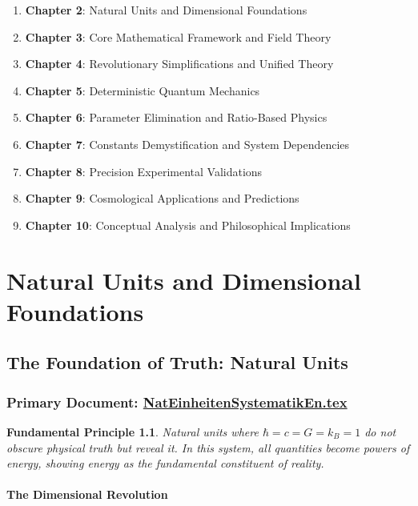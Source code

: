 \documentclass[12pt,a4paper]{report}
\newtheorem{principle}{Fundamental Principle}[chapter]
\begin{document}
	\begin{enumerate}
		\item \textbf{Chapter 2}: Natural Units and Dimensional Foundations
		\item \textbf{Chapter 3}: Core Mathematical Framework and Field Theory
		\item \textbf{Chapter 4}: Revolutionary Simplifications and Unified Theory
		\item \textbf{Chapter 5}: Deterministic Quantum Mechanics
		\item \textbf{Chapter 6}: Parameter Elimination and Ratio-Based Physics
		\item \textbf{Chapter 7}: Constants Demystification and System Dependencies
		\item \textbf{Chapter 8}: Precision Experimental Validations
		\item \textbf{Chapter 9}: Cosmological Applications and Predictions
		\item \textbf{Chapter 10}: Conceptual Analysis and Philosophical Implications
	\end{enumerate}
	
	\chapter{Natural Units and Dimensional Foundations}
	
	\section{The Foundation of Truth: Natural Units}
	\subsection{Primary Document: \href{https://github.com/jpascher/T0-Time-Mass-Duality/tree/main/2/pdf/NatEinheitenSystematikEn.pdf}{NatEinheitenSystematikEn.tex}}
	
	\begin{principle}
		Natural units where $\hbar = c = G = k_B = 1$ do not obscure physical truth but reveal it. In this system, all quantities become powers of energy, showing energy as the fundamental constituent of reality.
	\end{principle}
	
	\subsubsection{The Dimensional Revolution}
	
\end{document}
